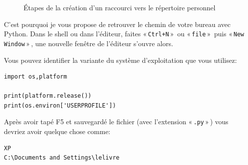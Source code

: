 \begin{figure}[H]
{\label{fig:comptera}
}

\caption{Étapes de la création d'un raccourci vers le répertoire personnel}
\label{fig:etapesra}
\end{figure}


C'est pourquoi je vous propose de retrouver le chemin de votre bureau avec Python.
Dans le shell ou dans l'éditeur, faites « \texttt{Ctrl+N} »  ou « \texttt{file} »  puis   
« \texttt{New Window} » , une nouvelle fenêtre de l'éditeur s'ouvre alors.

Vous pouvez identifier la variante du système d'exploitation que vous utilisez:
\begin{Verbatim}[frame=single,rulecolor=\color{mbleu}, label=à taper]
import os,platform

print(platform.release())
print(os.environ['USERPROFILE'])
\end{Verbatim}

Après avoir tapé F5 et sauvegardé le fichier (avec l'extension « \texttt{.py} » )  vous devriez avoir quelque chose comme:

\begin{Verbatim}[frame=single,rulecolor=\color{gray}, label=résultat]
XP
C:\Documents and Settings\lelivre
\end{Verbatim}

